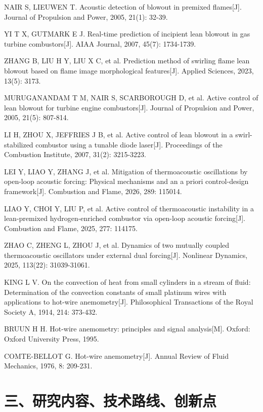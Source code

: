 \documentclass[UTF8,a4paper,zihao=-4,fontset=windows]{ctexart}
\begin{document}
{\begin{enumerate}[label={[\arabic*]}, leftmargin=2.2em,
  labelsep=0.2em, itemsep=0pt, parsep=0pt, topsep=2pt, partopsep=0pt]
\item NAIR S, LIEUWEN T. Acoustic detection of blowout in premixed flames[J]. Journal of Propulsion and Power, 2005, 21(1): 32-39.
\item YI T X, GUTMARK E J. Real-time prediction of incipient lean blowout in gas turbine combustors[J]. AIAA Journal, 2007, 45(7): 1734-1739.
\item ZHANG B, LIU H Y, LIU X C, et al. Prediction method of swirling flame lean blowout based on flame image morphological features[J]. Applied Sciences, 2023, 13(5): 3173.
\item MURUGANANDAM T M, NAIR S, SCARBOROUGH D, et al. Active control of lean blowout for turbine engine combustors[J]. Journal of Propulsion and Power, 2005, 21(5): 807-814.
\item LI H, ZHOU X, JEFFRIES J B, et al. Active control of lean blowout in a swirl-stabilized combustor using a tunable diode laser[J]. Proceedings of the Combustion Institute, 2007, 31(2): 3215-3223.
\item LEI Y, LIAO Y, ZHANG J, et al. Mitigation of thermoacoustic oscillations by open-loop acoustic forcing: Physical mechanisms and an a priori control-design framework[J]. Combustion and Flame, 2026, 289: 115014.
\item LIAO Y, CHOI Y, LIU P, et al. Active control of thermoacoustic instability in a lean-premixed hydrogen-enriched combustor via open-loop acoustic forcing[J]. Combustion and Flame, 2025, 277: 114175.
\item ZHAO C, ZHENG L, ZHOU J, et al. Dynamics of two mutually coupled thermoacoustic oscillators under external dual forcing[J]. Nonlinear Dynamics, 2025, 113(22): 31039-31061.
\item KING L V. On the convection of heat from small cylinders in a stream of fluid: Determination of the convection constants of small platinum wires with applications to hot-wire anemometry[J]. Philosophical Transactions of the Royal Society A, 1914, 214: 373-432.
\item BRUUN H H. Hot-wire anemometry: principles and signal analysis[M]. Oxford: Oxford University Press, 1995.
\item COMTE-BELLOT G. Hot-wire anemometry[J]. Annual Review of Fluid Mechanics, 1976, 8: 209-231.
\end{enumerate}
}
\vspace{0.5\baselineskip}
\section{三、研究内容、技术路线、创新点}
\end{document}
